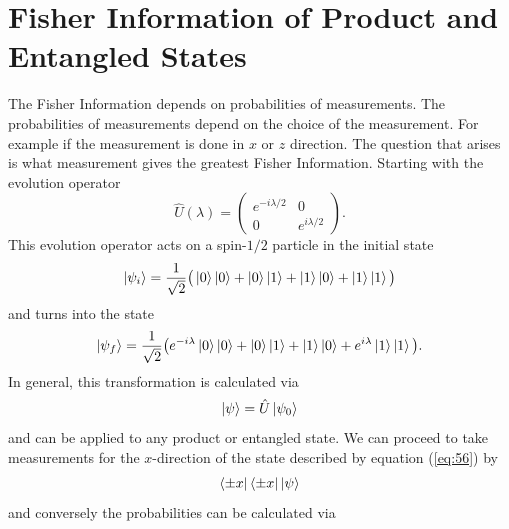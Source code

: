 \documentclass[twocolumn]{article}
\begin{document}
\section*{Fisher Information of Product and Entangled States}
The Fisher Information depends on probabilities of measurements. The probabilities of measurements depend on the choice of the measurement. For example if the measurement is done in $x$ or $z$ direction. The question that arises is what measurement gives the greatest Fisher Information. Starting with the evolution operator
\begin{equation} \label{eq:54}
\hat{U}(\lambda)=
\begin{pmatrix}
e^{-i\lambda/2} & 0 \\
0 & e^{i\lambda/2}
\end{pmatrix}.
\end{equation}
This evolution operator acts on a spin-$1/2$ particle in the initial state
\begin{equation} \label{eq:55}
\ket{\psi_i}=\frac{1}{\sqrt{2}}\big(\ket{0}\ket{0}+\ket{0}\ket{1}+\ket{1}\ket{0}+\ket{1}\ket{1}\big)
\end{equation}
and turns into the state
\begin{equation} \label{eq:56}
\ket{\psi_f}=\frac{1}{\sqrt{2}}\big(e^{-i\lambda}\ket{0}\ket{0}+\ket{0}\ket{1}+\ket{1}\ket{0}+e^{i\lambda}\ket{1}\ket{1}\big).
\end{equation}
In general, this transformation is calculated via
\begin{equation} \label{eq:57}
\ket{\psi}=\hat{U}\ket{\psi_0}
\end{equation}
and can be applied to any product or entangled state. We can proceed to take measurements for the $x$-direction of the state described by equation (\ref{eq:56}) by
\begin{equation} \label{eq:58}
\bra{\pm x}\bra{\pm x}\ket{\psi}
\end{equation}
and conversely the probabilities can be calculated via
\end{document}
